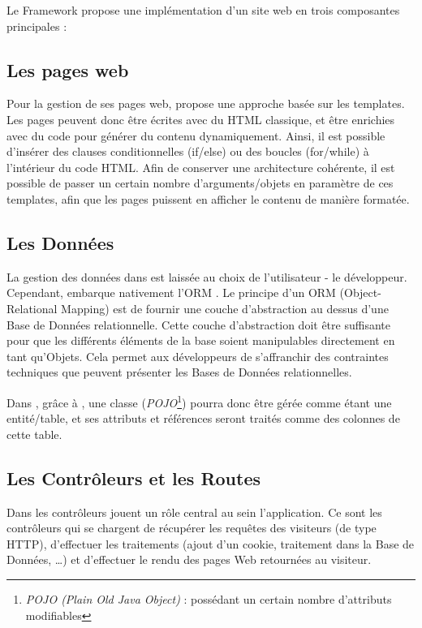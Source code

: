 Le Framework \kwplay{} propose une implémentation d'un site web en trois composantes principales :


\subsection{Les pages web}
Pour la gestion de ses pages web, \kwplay{} propose une approche basée sur les templates. Les pages peuvent donc être écrites avec du HTML classique, et être enrichies avec du code \kwscala{} pour générer du contenu dynamiquement. Ainsi, il est possible d'insérer des clauses conditionnelles (if/else) ou des boucles (for/while) à l'intérieur du code HTML. Afin de conserver une architecture cohérente, il est possible de passer un certain nombre d'arguments/objets en paramètre de ces templates, afin que les pages puissent en afficher le contenu de manière formatée.

\subsection{Les Données}
La gestion des données dans \kwplay{} est laissée au choix de l'utilisateur - le développeur. Cependant, \kwplay{} embarque nativement l'ORM \kwebean{}. Le principe d'un ORM (Object-Relational Mapping) est de fournir une couche d'abstraction au dessus d'une Base de Données relationnelle. Cette couche d'abstraction doit être suffisante pour que les différents éléments de la base soient manipulables directement en tant qu'Objets. Cela permet aux développeurs de s'affranchir des contraintes techniques que peuvent présenter les Bases de Données relationnelles.

Dans \kwplay{}, grâce à \kwebean{}, une classe \kwjava{} (\textit{POJO}\footnote{\textit{POJO (Plain Old Java Object)} :  possédant un certain nombre d'attributs modifiables}) pourra donc être gérée comme étant une entité/table, et ses attributs et références seront traités comme des colonnes de cette table.

\subsection{Les Contrôleurs et les Routes}
Dans \kwplay{} les contrôleurs jouent un rôle central au sein l'application. Ce sont les contrôleurs qui se chargent de récupérer les requêtes des visiteurs (de type HTTP), d'effectuer les traitements (ajout d'un cookie, traitement dans la Base de Données, \dots) et d'effectuer le rendu des pages Web retournées au visiteur.

